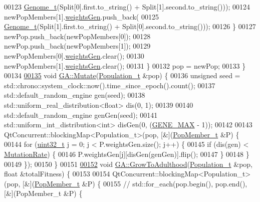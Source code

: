 \begin{DoxyCode}
00123           \hyperlink{_soil_math_types_8h_a58f6ab36d2cb0527a73caec36d14a0e0}{Genome\_t}(Split[0].first.to\_string() + Split[1].second.to\_string()));
00124       newPopMembers[1].\hyperlink{struct_pop_member_struct_a072fadb4863e0cf77b55ad3b46b62522}{weightsGen}.push\_back(
00125           \hyperlink{_soil_math_types_8h_a58f6ab36d2cb0527a73caec36d14a0e0}{Genome\_t}(Split[1].first.to\_string() + Split[0].second.to\_string()));
00126     \}
00127     newPop.push\_back(newPopMembers[0]);
00128     newPop.push\_back(newPopMembers[1]);
00129     newPopMembers[0].\hyperlink{struct_pop_member_struct_a072fadb4863e0cf77b55ad3b46b62522}{weightsGen}.clear();
00130     newPopMembers[1].\hyperlink{struct_pop_member_struct_a072fadb4863e0cf77b55ad3b46b62522}{weightsGen}.clear();
00131   \}
00132   pop = newPop;
00133 \}
00134 
\hypertarget{_g_a_8cpp_source_l00135}{}\hyperlink{class_soil_math_1_1_g_a_a489f2afd54086c14f45b654aeec0fe3c}{00135} \textcolor{keywordtype}{void} \hyperlink{class_soil_math_1_1_g_a_a489f2afd54086c14f45b654aeec0fe3c}{GA::Mutate}(\hyperlink{_soil_math_types_8h_a8d2d4c736cf817d048a2d66dec8b12ec}{Population\_t} &pop) \{
00136   \textcolor{keywordtype}{unsigned} seed = std::chrono::system\_clock::now().time\_since\_epoch().count();
00137   std::default\_random\_engine gen(seed);
00138   std::uniform\_real\_distribution<float> dis(0, 1);
00139 
00140   std::default\_random\_engine genGen(seed);
00141   std::uniform\_int\_distribution<int> disGen(0, (\hyperlink{_soil_math_types_8h_aa5e1eb1a998e5ed69af2076cf318df4b}{GENE\_MAX} - 1));
00142 
00143   QtConcurrent::blockingMap<Population\_t>(pop, [&](\hyperlink{struct_pop_member_struct}{PopMember\_t} &P) \{
00144     \textcolor{keywordflow}{for} (\hyperlink{_soil_math_types_8h_a435d1572bf3f880d55459d9805097f62}{uint32\_t} j = 0; j < P.weightsGen.size(); j++) \{
00145       \textcolor{keywordflow}{if} (dis(gen) < \hyperlink{class_soil_math_1_1_g_a_a82996d544a2f25b5a75ae8ba1e82d661}{MutationRate}) \{
00146         P.weightsGen[j][disGen(genGen)].flip();
00147       \}
00148     \}
00149   \});
00150 \}
00151 
\hypertarget{_g_a_8cpp_source_l00152}{}\hyperlink{class_soil_math_1_1_g_a_a7b84b10bfb6069fe44bbd137e3a9dbb0}{00152} \textcolor{keywordtype}{void} \hyperlink{class_soil_math_1_1_g_a_a7b84b10bfb6069fe44bbd137e3a9dbb0}{GA::GrowToAdulthood}(\hyperlink{_soil_math_types_8h_a8d2d4c736cf817d048a2d66dec8b12ec}{Population\_t} &pop, \textcolor{keywordtype}{float} &totalFitness) \{
00153 
00154   QtConcurrent::blockingMap<Population\_t>(pop, [&](\hyperlink{struct_pop_member_struct}{PopMember\_t} &P) \{
00155     \textcolor{comment}{// std::for\_each(pop.begin(), pop.end(), [&](PopMember\_t &P) \{}

\end{DoxyCode}
